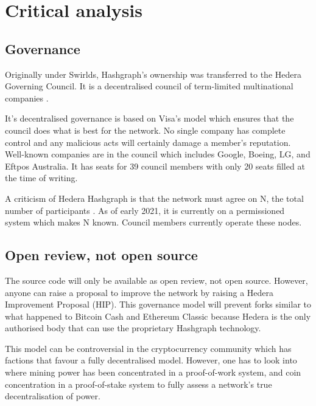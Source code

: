 \section{Critical analysis}

\subsection{Governance}
Originally under Swirlds, Hashgraph's ownership was transferred to the Hedera Governing Council. It is a decentralised council of term-limited multinational companies \cite{baird2018hedera}. 

It's decentralised governance is based on Visa's model\cite{hederacouncil} which ensures that the council does what is best for the network. No single company has complete control and any malicious acts will certainly damage a member's reputation. Well-known companies are in the council which includes Google, Boeing, LG, and Eftpos Australia. It has seats for 39 council members with only 20 seats filled at the time of writing.

A criticism of Hedera Hashgraph is that the network must agree on N, the total number of participants \cite{kauflin2018}. As of early 2021, it is currently on a permissioned system which makes N known. Council members currently operate these nodes. 


\subsection{Open review, not open source}
The source code will only be available as open review, not open source. However, anyone can raise a proposal to improve the network by raising a Hedera Improvement Proposal (HIP)\cite{hip}. This governance model will prevent forks similar to what happened to Bitcoin Cash and Ethereum Classic because Hedera is the only authorised body that can use the proprietary Hashgraph technology.

This model can be controversial in the cryptocurrency community which has factions that favour a fully decentralised model. However, one has to look into where mining power has been concentrated in a proof-of-work system, and coin concentration in a proof-of-stake system to fully assess a network's true decentralisation of power.

